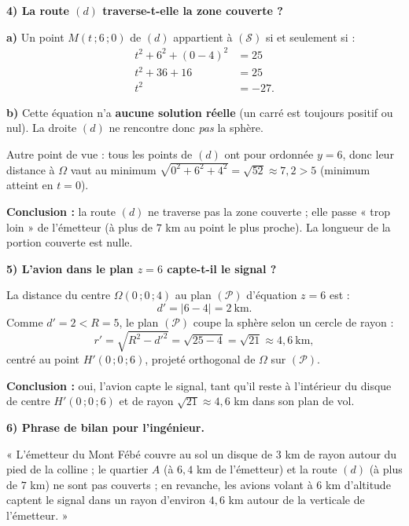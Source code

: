 \documentclass[11pt]{article}
\begin{document}
\begin{exoresolu}
\textbf{4) La route $(d)$ traverse-t-elle la zone couverte ?}

\textbf{a)} Un point $M(t\,;6\,;0)$ de $(d)$ appartient à $(\mathcal{S})$ si et seulement si :
\begin{align*}
t^{2}+6^{2}+(0-4)^{2}&=25\\
t^{2}+36+16&=25\\
t^{2}&=-27.
\end{align*}

\textbf{b)} Cette équation n'a \textbf{aucune solution réelle} (un carré est toujours positif ou nul). La droite $(d)$ ne rencontre donc \emph{pas} la sphère.

Autre point de vue : tous les points de $(d)$ ont pour ordonnée $y=6$, donc leur distance à $\Omega$ vaut au minimum $\sqrt{0^{2}+6^{2}+4^{2}}=\sqrt{52}\approx 7{,}2 > 5$ (minimum atteint en $t=0$).

\textbf{Conclusion :} la route $(d)$ ne traverse pas la zone couverte ; elle passe « trop loin » de l'émetteur (à plus de $7$ km au point le plus proche). La longueur de la portion couverte est nulle.

\textbf{5) L'avion dans le plan $z=6$ capte-t-il le signal ?}

La distance du centre $\Omega(0\,;0\,;4)$ au plan $(\mathcal{P})$ d'équation $z=6$ est :
\[ d'=\lvert 6-4\rvert = 2 \ \text{km}. \]
Comme $d'=2 < R=5$, le plan $(\mathcal{P})$ coupe la sphère selon un cercle de rayon :
\[ r'=\sqrt{R^{2}-d'^{2}}=\sqrt{25-4}=\sqrt{21}\approx 4{,}6 \ \text{km}, \]
centré au point $H'(0\,;0\,;6)$, projeté orthogonal de $\Omega$ sur $(\mathcal{P})$.

\textbf{Conclusion :} oui, l'avion capte le signal, tant qu'il reste à l'intérieur du disque de centre $H'(0\,;0\,;6)$ et de rayon $\sqrt{21}\approx 4{,}6$ km dans son plan de vol.

\textbf{6) Phrase de bilan pour l'ingénieur.}

« L'émetteur du Mont Fébé couvre au sol un disque de $3$ km de rayon autour du pied de la colline ; le quartier $A$ (à $6{,}4$ km de l'émetteur) et la route $(d)$ (à plus de $7$ km) ne sont pas couverts ; en revanche, les avions volant à $6$ km d'altitude captent le signal dans un rayon d'environ $4{,}6$ km autour de la verticale de l'émetteur. »
\end{exoresolu}
\end{document}
